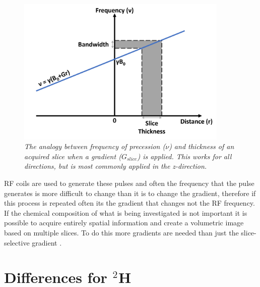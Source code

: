 \documentclass[class=article, crop=false]{standalone}
\begin{document}
\begin{figure}
    \centering
    \includegraphics[width=0.9\textwidth]{Figures/Theory/Gradient.png}
    \caption{\textit{The analogy between frequency of precession ($\nu$) and thickness of an acquired slice when a gradient ($G_{slice}$) is applied. This works for all directions, but is most commonly applied in the z-direction.}}
    \label{fig:theory:Grad}
\end{figure}

RF coils are used to generate these pulses and often the frequency that the pulse generates is more difficult to change than it is to change the gradient, therefore if this process is repeated often its the gradient that changes not the RF frequency. If the chemical composition of what is being investigated is not important it is possible to acquire entirely spatial information and create a volumetric image based on multiple slices. To do this more gradients are needed than just the slice-selective gradient \cite{deGraaf2019InSpectroscopy}.

\section{Differences for $^2$H}
\end{document}
